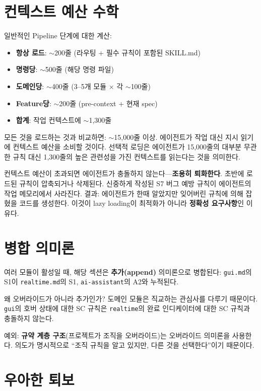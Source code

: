\documentclass[11pt,a4paper,openright,twoside]{report}
\begin{document}
\section{컨텍스트 예산 수학}

일반적인 Pipeline 단계에 대한 계산:

\begin{itemize}
  \item \textbf{항상 로드}: $\sim$200줄 (라우팅 + 필수 규칙이 포함된 SKILL.md)
  \item \textbf{명령당}: $\sim$500줄 (해당 명령 파일)
  \item \textbf{도메인당}: $\sim$400줄 (3--5개 모듈 $\times$ 각 $\sim$100줄)
  \item \textbf{Feature당}: $\sim$200줄 (pre-context + 현재 spec)
  \item \textbf{합계}: 작업 컨텍스트에 $\sim$1,300줄
\end{itemize}

모든 것을 로드하는 것과 비교하면: $\sim$15,000줄 이상. 에이전트가 작업 대신 지시 읽기에 컨텍스트 예산을 소비할 것이다. 선택적 로딩은 에이전트가 15,000줄의 대부분 무관한 규칙 대신 1,300줄의 높은 관련성을 가진 컨텍스트를 읽는다는 것을 의미한다.

컨텍스트 예산이 초과되면 에이전트가 충돌하지 않는다---\textbf{조용히 퇴화한다}. 초반에 로드된 규칙이 압축되거나 삭제된다. 신중하게 작성된 S7 버그 예방 규칙이 에이전트의 작업 메모리에서 사라진다. 결과: 에이전트가 한때 알았지만 잊어버린 규칙에 의해 잡혔을 코드를 생성한다. 이것이 lazy loading이 최적화가 아니라 \textbf{정확성 요구사항}인 이유다.

\section{병합 의미론}

여러 모듈이 활성일 때, 해당 섹션은 \textbf{추가(append)} 의미론으로 병합된다: \texttt{gui.md}의 S1이 \texttt{realtime.md}의 S1, \texttt{ai-assistant}의 A2와 누적된다.

왜 오버라이드가 아니라 추가인가? 도메인 모듈은 직교하는 관심사를 다루기 때문이다. \texttt{gui}의 호버 상태에 대한 SC 규칙은 \texttt{realtime}의 완료 인디케이터에 대한 SC 규칙과 충돌하지 않는다.

예외: \textbf{규약 계층 구조}(프로젝트가 조직을 오버라이드)는 오버라이드 의미론을 사용한다. 의도가 명시적으로 ``조직 규칙을 알고 있지만, 다른 것을 선택한다''이기 때문이다.

\section{우아한 퇴보}
\end{document}
